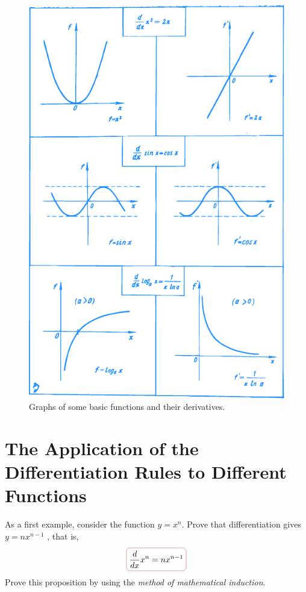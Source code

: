 \begin{figure}[!ht]%
\centering
\includegraphics[width=.9\textwidth]{figures/fig-42.pdf}
\caption{Graphs of some basic functions and their derivatives.}
\label{fig-42}
\end{figure}


\section*{The Application of the Differentiation Rules to Different Functions}
\label{sec-3-9}

\athr As a first example, consider the function $y =x^{n}$. Prove that differentiation gives $y = n x^{n - 1}$ , that is,
\begin{equation}%
\boxed{\ddx x^{n}  = n x^{n-1}}
\label{deriv-power}
\end{equation}
Prove this proposition by using the \emph{method of mathematical induction}.

